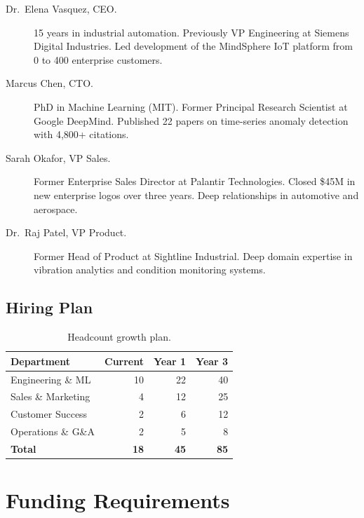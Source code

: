 \documentclass[
    language=english,
    doctype=business-plan,
    institution=none,
]{../../omnilatex}
\begin{document}
\begin{description}
    \item[Dr.\ Elena Vasquez, CEO.] 15 years in industrial automation.
        Previously VP Engineering at Siemens Digital Industries. Led
        development of the MindSphere IoT platform from 0 to 400 enterprise
        customers.
    \item[Marcus Chen, CTO.] PhD in Machine Learning (MIT). Former Principal
        Research Scientist at Google DeepMind. Published 22 papers on
        time-series anomaly detection with 4,800+ citations.
    \item[Sarah Okafor, VP Sales.] Former Enterprise Sales Director at
        Palantir Technologies. Closed \$45M in new enterprise logos over
        three years. Deep relationships in automotive and aerospace.
    \item[Dr.\ Raj Patel, VP Product.] Former Head of Product at Sightline
        Industrial. Deep domain expertise in vibration analytics and
        condition monitoring systems.
\end{description}

\subsection{Hiring Plan}

\begin{table}[h]
    \centering
    \begin{tabular}{lrrr}
        \toprule
        \textbf{Department} & \textbf{Current} & \textbf{Year 1} & \textbf{Year 3} \\
        \midrule
        Engineering \& ML    & 10 & 22 & 40 \\
        Sales \& Marketing   &  4 & 12 & 25 \\
        Customer Success     &  2 &  6 & 12 \\
        Operations \& G\&A   &  2 &  5 &  8 \\
        \midrule
        \textbf{Total}       & \textbf{18} & \textbf{45} & \textbf{85} \\
        \bottomrule
    \end{tabular}
    \caption{Headcount growth plan.}
\end{table}

\section{Funding Requirements}
\end{document}
